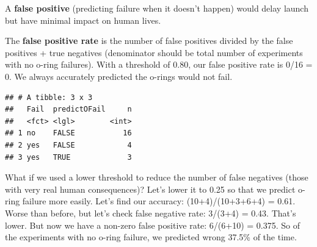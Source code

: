 \documentclass[]{book}
\newenvironment{Shaded}{\begin{snugshade}}{\end{snugshade}}
\newcommand{\DataTypeTok}[1]{\textcolor[rgb]{0.13,0.29,0.53}{#1}}
\newcommand{\FloatTok}[1]{\textcolor[rgb]{0.00,0.00,0.81}{#1}}
\newcommand{\KeywordTok}[1]{\textcolor[rgb]{0.13,0.29,0.53}{\textbf{#1}}}
\newcommand{\NormalTok}[1]{#1}
\newcommand{\OperatorTok}[1]{\textcolor[rgb]{0.81,0.36,0.00}{\textbf{#1}}}
\newcommand{\StringTok}[1]{\textcolor[rgb]{0.31,0.60,0.02}{#1}}
\begin{document}
A \textbf{false positive} (predicting failure when it doesn't happen) would delay launch but have minimal impact on human lives.

The \textbf{false positive rate} is the number of false positives divided by the false positives + true negatives (denominator should be total number of experiments with no o-ring failures). With a threshold of 0.80, our false positive rate is 0/16 = 0. We always accurately predicted the o-rings would not fail.

\begin{Shaded}
\end{Shaded}

\begin{verbatim}
## # A tibble: 3 x 3
##   Fail  predictOFail     n
##   <fct> <lgl>        <int>
## 1 no    FALSE           16
## 2 yes   FALSE            4
## 3 yes   TRUE             3
\end{verbatim}

What if we used a lower threshold to reduce the number of false negatives (those with very real human consequences)? Let's lower it to 0.25 so that we predict o-ring failure more easily. Let's find our accuracy: (10+4)/(10+3+6+4) = 0.61. Worse than before, but let's check false negative rate: 3/(3+4) = 0.43. That's lower. But now we have a non-zero false positive rate: 6/(6+10) = 0.375. So of the experiments with no o-ring failure, we predicted wrong 37.5\% of the time.

\begin{Shaded}
\end{Shaded}
\end{document}
